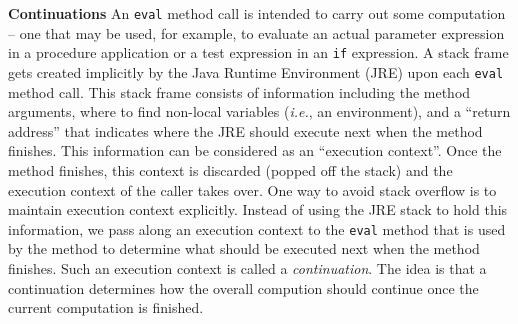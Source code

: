 \begin{minipage}[t]{\sw}
\slidenumber
\LARGE
{\bf Continuations}\exx
An \verb'eval' method call is intended
to carry out some computation --
one that may be used, for example,
to evaluate an actual parameter expression in a procedure application
or a test expression in an \verb'if' expression.
A stack frame gets created implicitly
by the Java Runtime Environment (JRE)
upon each \verb'eval' method call.
This stack frame consists of information
including the method arguments,
where to find non-local variables ({\em i.e.}, an environment),
and a ``return address'' that indicates
where the JRE should execute next when the method finishes.
This information can be considered as an ``execution context''.
Once the method finishes, this context is discarded
(popped off the stack)
and the execution context of the caller takes over.\exx
One way to avoid stack overflow
is to maintain execution context explicitly.
Instead of using the JRE stack to hold this information,
we pass along an execution context to the \verb'eval' method
that is used by the method
to determine what should be executed next
when the method finishes.
Such an execution context is called a {\em continuation}.
The idea is that a continuation determines
how the overall compution should continue
once the current computation is finished.
\end{minipage}
